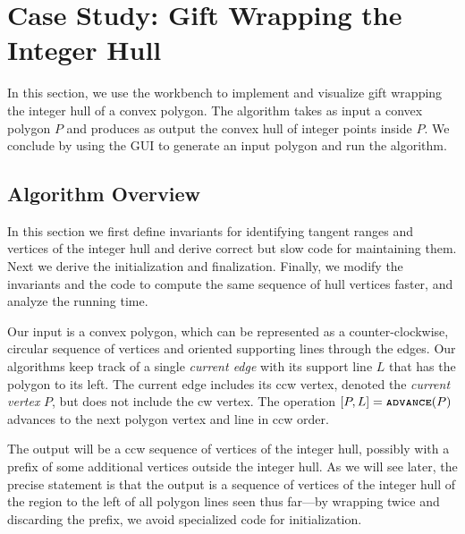 
\FloatBarrier
\section{Case Study: Gift Wrapping the Integer Hull}
\label{sec:case-ihull}

In this section, we use the workbench to implement and visualize gift wrapping
the integer hull of a convex polygon. The algorithm takes as input a
convex polygon $P$ and produces as output the convex hull of integer points
inside $P$. We conclude by using the GUI to generate an input polygon and run
the algorithm.


\subsection{Algorithm Overview}

In this section we first define invariants for identifying tangent ranges and
vertices of the integer hull and derive correct but slow code for maintaining
them. Next we derive the initialization and finalization.  Finally, we modify
the invariants and the code to compute the same sequence of hull vertices
faster, and analyze the running time.

Our input is a convex polygon, which can be represented as a counter-clockwise,
circular sequence of vertices and oriented supporting lines through the edges.
Our algorithms keep track of a single {\it current edge} with its support line 
$L$ that has the polygon to its left.  The current edge includes its ccw vertex,
denoted the {\it current vertex} $P$, but does not include the cw vertex.  The
operation $[P,L]=\op advance(P)$ advances to the next polygon vertex and line in
ccw order.

The output will be a ccw sequence of vertices of the integer hull, possibly with
a prefix of some additional vertices outside the integer hull.  As we will see
later, the precise statement is that the output is a sequence of vertices of the
integer hull of the region to the left of all polygon lines seen thus far---by
wrapping twice and discarding the prefix, we avoid specialized code for
initialization. 

